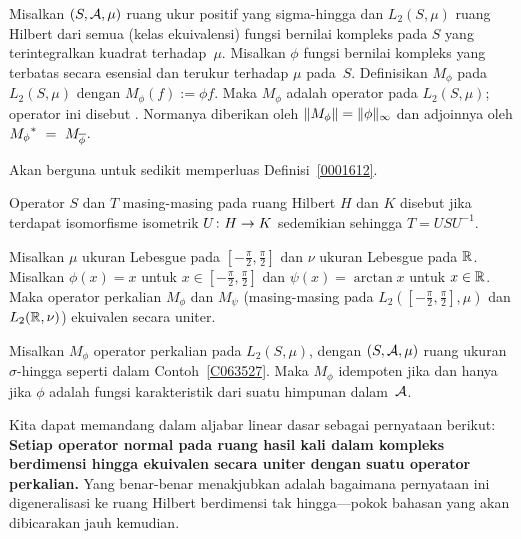 \begin{exam}\label{C063527} Misalkan $(S,\mathcal{A}, \mu)$ ruang ukur positif yang sigma-hingga dan $L_2(S,\mu)$
ruang Hilbert dari semua (kelas ekuivalensi) fungsi bernilai kompleks pada $S$
yang terintegralkan kuadrat terhadap~$\mu$. Misalkan $\phi$ fungsi bernilai kompleks yang
terbatas secara esensial dan terukur terhadap $\mu$ pada~$S$. Definisikan
$M_\phi$ pada $L_2(S,\mu)$ dengan $M_\phi(f) := \phi f$. Maka $M_\phi$ adalah operator pada $L_2(S,\mu)$; operator ini disebut
. Normanya diberikan oleh $\lVert M_\phi\rVert = \lVert\phi\rVert_\infty$ dan
adjoinnya oleh ${M_\phi}^*~=~M_{\overline{\phi}}$.
\end{exam}

Akan berguna untuk sedikit memperluas Definisi~\ref{0001612}.

\begin{defn} Operator $S$ dan $T$ masing-masing pada ruang Hilbert $H$ dan $K$ disebut
 jika terdapat isomorfisme isometrik $U\colon H \rightarrow K$ sedemikian sehingga $T = USU^{-1}$.

\end{defn}

\begin{exam} Misalkan $\mu$ ukuran Lebesgue pada $[-\frac\pi2, \frac\pi2]$ dan $\nu$ ukuran Lebesgue pada $\mathbb{R}$.
Misalkan $\phi(x) = x$ untuk $x \in [-\frac\pi2, \frac\pi2]$ dan $\psi(x) = \arctan x$ untuk $x \in \mathbb{R}$. Maka operator
perkalian $M_\phi$ dan $M_\psi$ (masing-masing pada $L_2([-\frac\pi2, \frac\pi2], \mu)$ dan $L_2(\mathbb{R}, \nu)$)
ekuivalen secara uniter.
\end{exam}

\begin{exam} Misalkan $M_\phi$ operator perkalian pada $L_2(S,\mu)$, dengan $(S,\mathcal{A},\mu)$
ruang ukuran $\sigma$-hingga seperti dalam Contoh~\ref{C063527}. Maka $M_\phi$ idempoten jika dan hanya jika
$\phi$ adalah fungsi karakteristik dari suatu himpunan dalam~$\mathcal{A}$.
\end{exam}

Kita dapat memandang
 dalam aljabar linear dasar sebagai pernyataan berikut: \textbf{Setiap operator normal pada ruang hasil kali dalam kompleks
berdimensi hingga ekuivalen secara uniter dengan suatu operator perkalian.} Yang benar-benar
menakjubkan adalah bagaimana pernyataan ini digeneralisasi ke ruang Hilbert berdimensi tak hingga---pokok bahasan
yang akan dibicarakan jauh kemudian.

